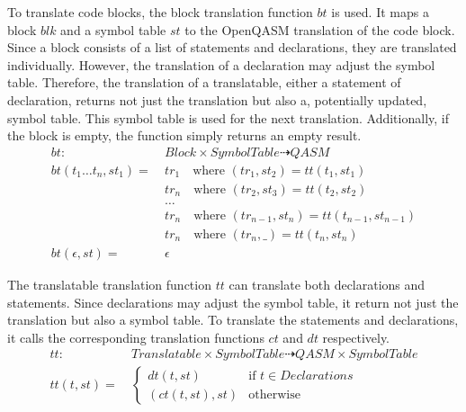 To translate code blocks, the block translation function $bt$ is used. It maps a block $blk$ and a symbol table $st$ to the OpenQASM translation of the code block. Since a block consists of a list of statements and declarations, they are translated individually. However, the translation of a declaration may adjust the symbol table. Therefore, the translation of a translatable, \ie either a statement of declaration, returns not just the translation but also a, potentially updated, symbol table. This symbol table is used for the next translation. Additionally, if the block is empty, the function simply returns an empty result. 
\begin{align*}
    bt : \ & Block \times SymbolTable \dashrightarrow QASM\\
    bt(t_1 \dots t_n, st_1) = \ &  tr_1 \quad \text{where } (tr_1, st_2) = tt(t_1, st_1)\\
    & tr_n \quad \text{where } (tr_2, st_3) = tt(t_2, st_2)\\
    & \dots\\
    & tr_n \quad \text{where } (tr_{n - 1}, st_n) = tt(t_{n - 1}, st_{n - 1})\\
    & tr_n \quad \text{where } (tr_n, \_) = tt(t_n, st_n)\\
    bt(\epsilon, st) = \ &  \epsilon 
\end{align*}

The translatable translation function $tt$ can translate both declarations and statements. Since declarations may adjust the symbol table, it return not just the translation but also a symbol table. To translate the statements and declarations, it calls the corresponding translation functions $ct$ and $dt$ respectively.
\begin{align*}
    tt : \ & Translatable \times SymbolTable \dashrightarrow QASM \times SymbolTable\\
    tt(t, st) = \ & \begin{cases}
        dt(t, st)  \quad &\text{if } t \in Declarations\\
        (ct(t, st), st) &\text{otherwise }
    \end{cases}  
\end{align*}

